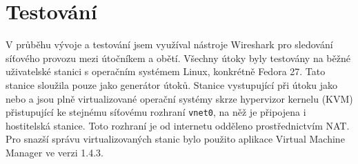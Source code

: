 \chapter{Testování}
\label{chap:testovani}
V průběhu vývoje a testování jsem využíval nástroje Wireshark pro sledování síťového provozu mezi útočníkem a obětí. Všechny útoky byly testovány na běžné uživatelské stanici s operačním systémem Linux, konkrétně Fedora 27. Tato stanice sloužila pouze jako generátor útoků. Stanice vystupující při útoku jako  nebo  a  jsou plně virtualizované operační systémy skrze hypervizor kernelu (KVM) přistupující ke stejnému síťovému rozhraní \texttt{vnet0}, na něž je připojena i hostitelská stanice. Toto rozhraní je od internetu odděleno prostřednictvím NAT. Pro snazší správu virtualizovaných stanic bylo použito aplikace Virtual Machine Manager ve verzi 1.4.3.


